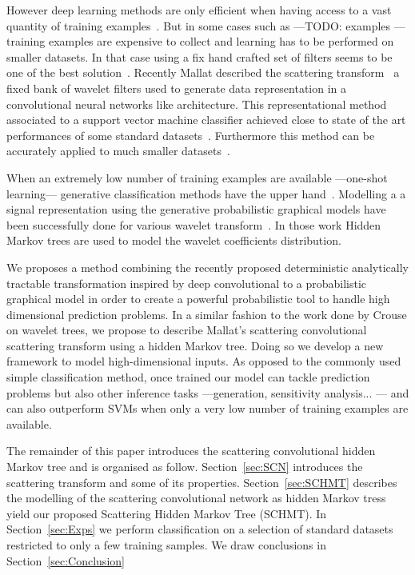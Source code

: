 \documentclass{article}
\begin{document}
	However deep learning methods are only efficient when having access to a vast quantity of training examples~\citep{link to paper at end of paragraph}. But in some cases such as ---TODO: examples --- training examples are expensive to collect and learning has to be performed on smaller datasets. In that case using a fix hand crafted set of filters seems to be one of the best solution~\citep{hand crafter filter, wavelet}. Recently Mallat described the scattering transform~\citep{gis mallat} a fixed bank of wavelet filters used to generate data representation in a convolutional neural networks like architecture. This representational method associated to a support vector machine classifier achieved close to state of the art performances of some standard datasets~\citep{bruna}. Furthermore this method can be accurately applied to much smaller datasets~\citep{texture clf}.
	
	When an extremely low number of training examples are available ---one-shot learning--- generative classification methods have the upper hand~\citep{one-shot learning, better generative}. Modelling a a signal representation using the generative probabilistic graphical models have been successfully done for various wavelet transform~\citep{Crouse, kingsbury}. In those work Hidden Markov trees are used to model the wavelet coefficients distribution.

    
	We proposes a method combining the recently proposed deterministic analytically tractable transformation inspired by deep convolutional to a probabilistic graphical model in order to create a powerful probabilistic tool to handle high dimensional prediction problems. In a similar fashion to the work done by Crouse on wavelet trees, we propose to describe Mallat's scattering convolutional scattering transform using a hidden Markov tree. Doing so we develop a new framework to model high-dimensional inputs. As opposed to the commonly used simple classification method, once trained our model can tackle prediction problems but also other inference tasks ---\eg generation, sensitivity analysis... --- and can also outperform SVMs when only a very low number of training examples are available.

  The remainder of this paper introduces the scattering convolutional hidden Markov tree and is organised as follow. Section~\ref{sec:SCN} introduces the scattering transform and some of its properties. Section~\ref{sec:SCHMT} describes the modelling of the scattering convolutional network as hidden Markov tress yield our proposed Scattering Hidden Markov Tree (SCHMT). In Section~\ref{sec:Exps} we perform classification on a selection of standard datasets restricted to only a few training samples. We draw conclusions in Section~\ref{sec:Conclusion}
\end{document}
